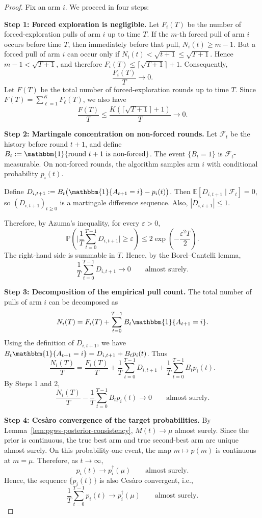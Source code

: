 \documentclass[10pt]{article}
\theoremstyle{plain}
\begin{document}
\begin{proof}
Fix an arm $i$. We proceed in four steps:

\textbf{Step 1: Forced exploration is negligible.}
Let $F_i(T)$ be the number of forced-exploration pulls of arm $i$ up to time $T$.
If the $m$-th forced pull of arm $i$ occurs before time $T$, then immediately before that pull,
$N_i(t)\ge m-1$.
But a forced pull of arm $i$ can occur only if
$N_i(t)<\sqrt{t+1}\le \sqrt{T+1}$.
Hence
$m-1<\sqrt{T+1}$,
and therefore
$F_i(T)\le \lceil \sqrt{T+1}\rceil+1$.
Consequently,
\[
\frac{F_i(T)}{T}\to0.
\]
Let $F(T)$ be the total number of forced-exploration rounds up to time $T$. Since
$F(T)=\sum_{\ell=1}^K F_\ell(T)$,
we also have
\[
\frac{F(T)}{T}\le
\frac{K(\lceil\sqrt{T+1}\rceil+1)}{T}
\to0.
\]

\textbf{Step 2: Martingale concentration on non-forced rounds.}
Let $\mathcal F_t$ be the history before round $t+1$, and define
$B_t
:=
\mathbbm{1}\{\text{round }t+1\text{ is non-forced}\}$.
The event $\{B_t=1\}$ is $\mathcal F_t$-measurable. On non-forced rounds, the algorithm samples arm $i$ with conditional probability $p_i(t)$.

Define
$D_{i,t+1}
:=
B_t\bigl(\mathbbm{1}\{A_{t+1}=i\}-p_i(t)\bigr)$.
Then
$\mathbb E[D_{i,t+1}\mid \mathcal F_t]=0$,
so $(D_{i,t+1})_{t\ge0}$ is a martingale difference sequence. Also,
$|D_{i,t+1}|\le1$.

Therefore, by Azuma's inequality, for every $\varepsilon>0$,
\[
\mathbb P\left(
\bigg|
\frac1T\sum_{t=0}^{T-1}D_{i,t+1}
\bigg|
\ge \varepsilon
\right)
\le
2\exp\left(-\frac{\varepsilon^2T}{2}\right).
\]
The right-hand side is summable in $T$. Hence, by the Borel--Cantelli lemma,
\[
\frac1T\sum_{t=0}^{T-1}D_{i,t+1}\to0
\qquad\text{almost surely}.
\]

\textbf{Step 3: Decomposition of the empirical pull count.}
The total number of pulls of arm $i$ can be decomposed as
\[
N_i(T)
=
F_i(T)
+
\sum_{t=0}^{T-1}
B_t\mathbbm{1}\{A_{t+1}=i\}.
\]
Using the definition of $D_{i,t+1}$, we  have
$B_t\mathbbm{1}\{A_{t+1}=i\}
=
D_{i,t+1}+B_t p_i(t)$.
Thus
\[
\frac{N_i(T)}{T}
=
\frac{F_i(T)}{T}
+
\frac1T\sum_{t=0}^{T-1}D_{i,t+1}
+
\frac1T\sum_{t=0}^{T-1}B_t p_i(t).
\]
By Steps 1 and 2,
\[
\frac{N_i(T)}{T}
-
\frac1T\sum_{t=0}^{T-1}B_t p_i(t)
\to0
\qquad\text{almost surely}.
\]

\textbf{Step 4: Ces\`aro convergence of the target probabilities.}
By Lemma~\ref{lem:pgws-posterior-consistency}, $M(t)\to \mu$ almost surely. 
Since the prior is continuous, the true best arm and true second-best arm are unique almost surely. On this probability-one event, the map $m\mapsto p(m)$ is continuous at $m=\mu$. Therefore, as $t \to \infty$,
\[
p_i(t)\to p_i^\dagger(\mu)
\qquad\text{almost surely}.
\]
Hence, the sequence $\{p_i(t)\}$ is also  Ces\`aro convergent, i.e., 
\[
\frac1T\sum_{t=0}^{T-1}p_i(t)
\to
p_i^\dagger(\mu)
\qquad\text{almost surely}.
\]


\end{proof}
\end{document}
